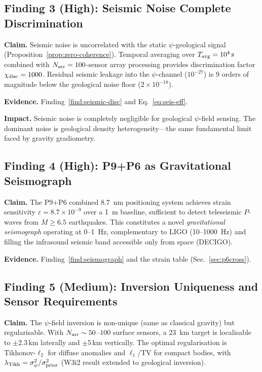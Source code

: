 \documentclass[aps,prd,twocolumn,superscriptaddress,nofootinbib]{revtex4-2}
\newcommand{\km}{\,\mathrm{km}}
\begin{document}
\subsection*{Finding 3 (High): Seismic Noise Complete Discrimination}

\textbf{Claim.} Seismic noise is uncorrelated with the static $\psi$-geological
signal (Proposition~\ref{prop:zero-coherence}).  Temporal averaging over
$T_{\rm avg} = 10^4\,\mathrm{s}$ combined with $N_{\rm arr} = 100$-sensor
array processing provides discrimination factor $\chi_{\rm disc} = 1000$.
Residual seismic leakage into the $\psi$-channel ($10^{-27}$) is 9 orders
of magnitude below the geological noise floor ($2\times10^{-18}$).

\textbf{Evidence.} Finding~\ref{find:seismic-disc} and
Eq.~\eqref{eq:seis-eff}.

\textbf{Impact.} Seismic noise is completely negligible for geological
$\psi$-field sensing.  The dominant noise is geological density
heterogeneity---the same fundamental limit faced by gravity gradiometry.

\subsection*{Finding 4 (High): P9+P6 as Gravitational Seismograph}

\textbf{Claim.} The P9+P6 combined 8.7~nm positioning system achieves
strain sensitivity $\varepsilon = 8.7\times10^{-9}$ over a 1~m baseline,
sufficient to detect teleseismic $P$-waves from $M \geq 6.5$ earthquakes.
This constitutes a novel \emph{gravitational seismograph} operating
at 0--1~Hz, complementary to LIGO (10--1000~Hz) and filling the
infrasound seismic band accessible only from space (DECIGO).

\textbf{Evidence.} Finding~\ref{find:seismograph} and the strain
table (Sec.~\ref{sec:p6cross}).

\subsection*{Finding 5 (Medium): Inversion Uniqueness and Sensor Requirements}

\textbf{Claim.} The $\psi$-field inversion is non-unique (same as classical
gravity) but regularisable.  With $N_{\rm arr} \sim 50$--$100$ surface
sensors, a 23~km target is localisable to $\pm 2.3\km$ laterally and
$\pm 5\km$ vertically.  The optimal regularisation is Tikhonov-$\ell_2$
for diffuse anomalies and $\ell_1$/TV for compact bodies, with
$\lambda_{\rm Tikh} = \sigma_\psi^2/\sigma_{\rm prior}^2$ (W3i2 result
extended to geological inversion).
\end{document}
